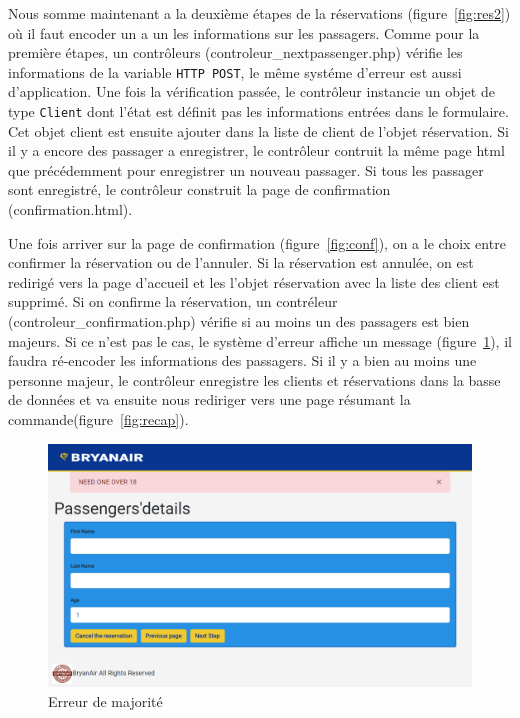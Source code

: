 \documentclass[12pt,a4paper]{article}
\begin{document}
			Nous somme maintenant a la deuxième étapes de la réservations (figure~\ref{fig:res2}) où il faut encoder un a un les informations sur les passagers. Comme pour la première étapes, un contrôleurs (controleur\_nextpassenger.php) vérifie les informations de la variable \texttt{HTTP POST}, le même systéme d'erreur est aussi d'application. Une fois la vérification passée, le contrôleur instancie un objet de type \texttt{Client} dont l'état est définit pas les informations entrées dans le formulaire. Cet objet client est ensuite ajouter dans la liste de client de l'objet réservation. Si il y a encore des passager a enregistrer, le contrôleur contruit la même page html que précédemment pour enregistrer un nouveau passager. Si tous les passager sont enregistré, le contrôleur construit la page de confirmation (confirmation.html).

			Une fois arriver sur la page de confirmation (figure~\ref{fig:conf}), on a le choix entre confirmer la réservation ou de l'annuler. Si la réservation est annulée, on est redirigé vers la page d'accueil et les l'objet réservation avec la liste des client est supprimé. Si on confirme la réservation, un contréleur (controleur\_confirmation.php) vérifie si au moins un des passagers est bien majeurs. Si ce n'est pas le cas, le système d'erreur affiche un message (figure~\ref{fig:ageError}), il faudra ré-encoder les informations des passagers. Si il y a bien au moins une personne majeur, le contrôleur enregistre les clients et réservations dans la basse de données et va ensuite nous rediriger vers une page résumant la commande(figure~\ref{fig:recap}).

			\begin{figure}
        \includegraphics[width=\textwidth]{ageError.png}
				\caption{Erreur de majorité}
				\label{fig:ageError}
			\end{figure}
\end{document}
